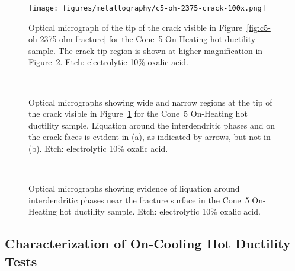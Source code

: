 {\begin{figure}
    \centering
    \texttt{[image: figures/metallography/c5-oh-2375-crack-100x.png]}
    \caption[Optical micrograph of the tip of the crack visible in Figure~\ref{fig:c5-oh-2375-olm-fracture}.]{Optical micrograph of the tip of the crack visible in Figure~\ref{fig:c5-oh-2375-olm-fracture} for the Cone~5 On-Heating \protect{} hot ductility sample. The crack tip region is shown at higher magnification in Figure~\ref{fig:c5-oh-2375-crack-tip-500x}. Etch: electrolytic 10\% oxalic acid.}
    \label{fig:c5-oh-2375-crack-100x}
\end{figure}

\begin{figure}
    \centering
     \\
    \caption[Optical micrographs showing wide and narrow regions at the tip of the crack visible in Figure~\ref{fig:c5-oh-2375-crack-100x}.]{Optical micrographs showing wide and narrow regions at the tip of the crack visible in Figure~\ref{fig:c5-oh-2375-crack-100x} for the Cone~5 On-Heating \protect{} hot ductility sample. Liquation around the interdendritic phases and on the crack faces is evident in (a), as indicated by arrows, but not in (b). Etch: electrolytic 10\% oxalic acid.}
    \label{fig:c5-oh-2375-crack-tip-500x}
\end{figure}

\begin{figure}
    \centering
     \\
    \caption{Optical micrographs showing evidence of liquation around interdendritic phases near the fracture surface in the Cone~5 On-Heating \protect{} hot ductility sample. Etch: electrolytic 10\% oxalic acid.}
    \label{fig:c5-oh-2375-liquation-fracture-surface}
\end{figure}
\clearpage


\subsection{Characterization of On-Cooling Hot Ductility Tests}
}
